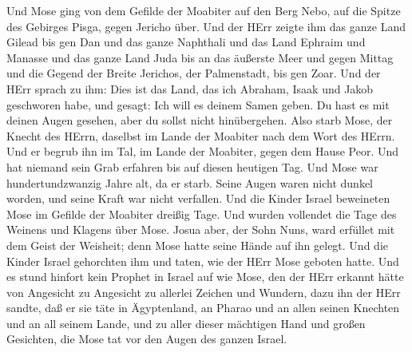  Und Mose ging von dem Gefilde der Moabiter auf den Berg
Nebo, auf die Spitze des Gebirges Pisga, gegen Jericho über. Und der
HErr zeigte ihm das ganze Land Gilead bis gen Dan  und das
ganze Naphthali und das Land Ephraim und Manasse und das ganze Land Juda
bis an das äußerste Meer  und gegen Mittag und die Gegend
der Breite Jerichos, der Palmenstadt, bis gen Zoar.  Und der
HErr sprach zu ihm: Dies ist das Land, das ich Abraham, Isaak und Jakob
geschworen habe, und gesagt: Ich will es deinem Samen geben. Du hast es
mit deinen Augen gesehen, aber du sollst nicht hinübergehen.
 Also starb Mose, der Knecht des HErrn, daselbst im Lande
der Moabiter nach dem Wort des HErrn.  Und er begrub ihn im
Tal, im Lande der Moabiter, gegen dem Hause Peor. Und hat niemand sein
Grab erfahren bis auf diesen heutigen Tag.  Und Mose war
hundertundzwanzig Jahre alt, da er starb. Seine Augen waren nicht dunkel
worden, und seine Kraft war nicht verfallen.  Und die Kinder
Israel beweineten Mose im Gefilde der Moabiter dreißig Tage. Und wurden
vollendet die Tage des Weinens und Klagens über Mose.  Josua
aber, der Sohn Nuns, ward erfüllet mit dem Geist der Weisheit; denn Mose
hatte seine Hände auf ihn gelegt. Und die Kinder Israel gehorchten ihm
und taten, wie der HErr Mose geboten hatte.  Und es stund
hinfort kein Prophet in Israel auf wie Mose, den der HErr erkannt hätte
von Angesicht zu Angesicht  zu allerlei Zeichen und
Wundern, dazu ihn der HErr sandte, daß er sie täte in Ägyptenland, an
Pharao und an allen seinen Knechten und an all seinem Lande,
 und zu aller dieser mächtigen Hand und großen Gesichten,
die Mose tat vor den Augen des ganzen Israel.
